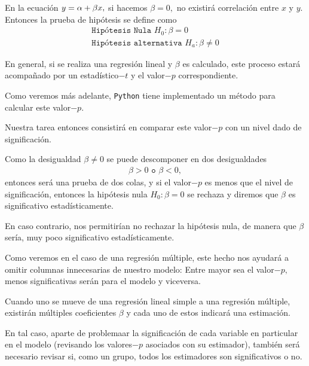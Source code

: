 En la ecuación $y = \alpha + \beta x,$ si hacemos $\beta=0,$ no existirá correlación entre $x$ y $y$. Entonces la prueba de hipótesis se define como
\begin{align}
	\texttt{Hipótesis Nula }H_{0}:\beta=0 \\
	\texttt{Hipótesis alternativa }H_{a}: \beta \neq 0
\end{align}




En general, si se realiza una regresión lineal y $\beta $ es calculado, este proceso estará acompañado por un estadístico$-t$ y el valor$-p$ correspondiente.



Como veremos más adelante, \texttt{Python} tiene implementado un método para calcular este valor$-p$.



Nuestra tarea entonces consistirá en comparar este valor$-p$ con un nivel dado de significación.



Como la desigualdad $\beta\neq 0$ se puede descomponer en dos desigualdades
\begin{align}
	\beta>0 \texttt{ o }\beta<0,
\end{align}
entonces será una prueba de dos colas, y si el valor$-p$ es menos que el nivel de significación, entonces la hipótesis nula $H_{0}: \beta = 0$ se rechaza y diremos que $\beta$ es significativo estadísticamente.



En caso contrario, nos permitirían no rechazar la hipótesis nula, de manera que $\beta$ sería, muy poco significativo estadísticamente.



Como veremos en el caso de una regresión múltiple, este hecho nos ayudará a omitir columnas innecesarias de nuestro modelo: Entre mayor sea el valor$-p,$ menos significativas serán para el modelo y viceversa.


Cuando uno se mueve de una regresión lineal simple a una regresión múltiple, existirán múltiples coeficientes $\beta$ y cada uno de estos indicará una estimación.



En tal caso, aparte de problemaar la significación de cada variable en particular en el modelo (revisando los valores$-p$ asociados con su estimador), también será necesario revisar si, como un grupo, todos los estimadores son significativos o no.




